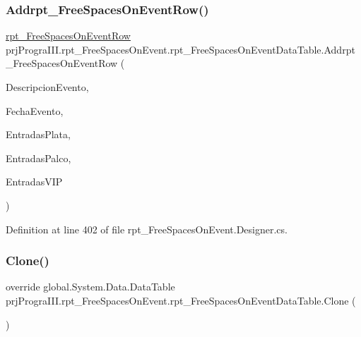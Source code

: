 \subsubsection{\texorpdfstring{Addrpt\+\_\+\+Free\+Spaces\+On\+Event\+Row()}{Addrpt\_FreeSpacesOnEventRow()}\hspace{0.1cm}{\footnotesize\ttfamily [2/2]}}
{\footnotesize\ttfamily \hyperlink{classprj_progra_i_i_i_1_1rpt___free_spaces_on_event_1_1rpt___free_spaces_on_event_row}{rpt\+\_\+\+Free\+Spaces\+On\+Event\+Row} prj\+Progra\+I\+I\+I.\+rpt\+\_\+\+Free\+Spaces\+On\+Event.\+rpt\+\_\+\+Free\+Spaces\+On\+Event\+Data\+Table.\+Addrpt\+\_\+\+Free\+Spaces\+On\+Event\+Row (\begin{DoxyParamCaption}\item[{string}]{Descripcion\+Evento,  }\item[{System.\+Date\+Time}]{Fecha\+Evento,  }\item[{int}]{Entradas\+Plata,  }\item[{int}]{Entradas\+Palco,  }\item[{int}]{Entradas\+V\+IP }\end{DoxyParamCaption})}



Definition at line 402 of file rpt\+\_\+\+Free\+Spaces\+On\+Event.\+Designer.\+cs.

\hypertarget{classprj_progra_i_i_i_1_1rpt___free_spaces_on_event_1_1rpt___free_spaces_on_event_data_table_ad22261209728da11260b9ec279fdeb3b}{}\label{classprj_progra_i_i_i_1_1rpt___free_spaces_on_event_1_1rpt___free_spaces_on_event_data_table_ad22261209728da11260b9ec279fdeb3b} 
\subsubsection{\texorpdfstring{Clone()}{Clone()}}
{\footnotesize\ttfamily override global.\+System.\+Data.\+Data\+Table prj\+Progra\+I\+I\+I.\+rpt\+\_\+\+Free\+Spaces\+On\+Event.\+rpt\+\_\+\+Free\+Spaces\+On\+Event\+Data\+Table.\+Clone (\begin{DoxyParamCaption}{ }\end{DoxyParamCaption})}



